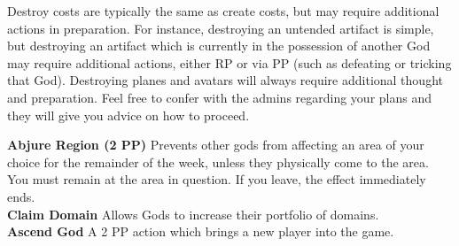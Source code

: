 \documentclass[10pt,a4paper]{article}
\begin{document}
Destroy costs are typically the same as create costs, but may require additional actions in preparation.  For instance, destroying an untended artifact is simple, but destroying an artifact which is currently in the possession of another God may require additional actions, either RP or via PP (such as defeating or tricking that God).  Destroying planes and avatars will always require additional thought and preparation.  Feel free to confer with the admins regarding your plans and they will give you advice on how to proceed.

\vspace{10pt}
\textbf{Abjure Region (2 PP)} Prevents other gods from affecting an area of your choice for the remainder of the week, unless they physically come to the area.  You must remain at the area in question.  If you leave, the effect immediately ends.\\

\textbf{Claim Domain} Allows Gods to increase their portfolio of domains.\\

\textbf{Ascend God}  A 2 PP action which brings a new player into the game.\\ 
\end{document}
